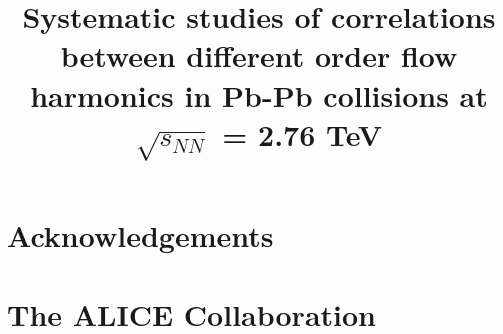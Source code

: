 \documentclass[ALICE,manyauthors]{cernphprep}
\begin{document}
%
%
\newcommand{\PbPb}{\textnormal{Pb-Pb}}
\newcommand{\AuAu}{\textnormal{Au-Au}}
\newcommand{\tn}[1]{\textnormal{#1}}
\newcommand{\snn}{\ensuremath{\sqrt{s_{NN}}}}
\newcommand{\chisqndf}{\chi^2/N_{\rm dof}}
\newcommand{\CKBNOTE}[1]{{\bf CKB:  #1}} 
\renewcommand{\CKBNOTE}[1]{}  %

\newcommand{\RHNOTE}[1]{{\bf RH:  #1}} 
\renewcommand{\RHNOTE}[1]{}  %
\newcommand{\multfigsize}{0.95}
\begin{titlepage}
%
%
%
\title{Systematic studies of correlations between different order flow harmonics in Pb-Pb collisions at $\sqrt{s_{NN}}$ = 2.76 TeV}

%
%
\begin{abstract}

\end{abstract}
\end{titlepage}
\setcounter{page}{2}


\newenvironment{acknowledgement}{\relax}{\relax}
\begin{acknowledgement}
\section*{Acknowledgements}
\end{acknowledgement}



%


\clearpage
\newpage


\section{The ALICE Collaboration}
\label{app:collab}
%
\end{document}
